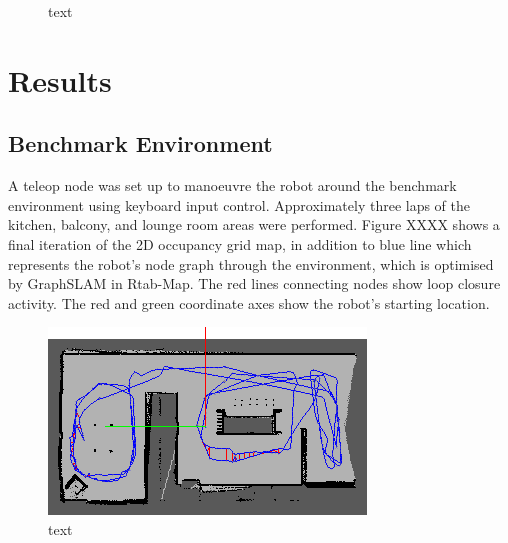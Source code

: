 \documentclass[a4paper]{article}
\begin{document}
\begin{figure}[h]
\centering
{}
\caption{text}
\end{figure}

\section{Results}
\subsection{Benchmark Environment}
A teleop node was set up to manoeuvre the robot around the benchmark environment using keyboard input control. Approximately three laps of the kitchen, balcony, and lounge room areas were performed. Figure XXXX shows a final iteration of the 2D occupancy grid map, in addition to blue line which represents the robot's node graph through the environment, which is optimised by GraphSLAM in Rtab-Map. The red lines connecting nodes show loop closure activity. The red and green coordinate axes show the robot's starting location.
\begin{figure}[h]
\centering
\includegraphics[scale=0.8]{kitchen_graph_view}
\caption{text}
\end{figure}
\end{document}

